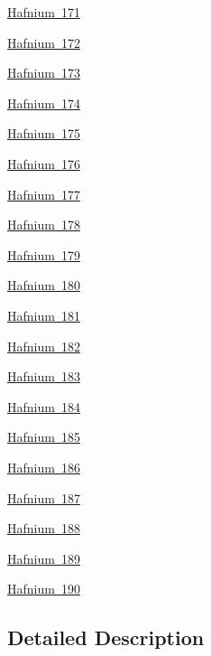 \begin{DoxyCompactItemize}
\item 
\mbox{\hyperlink{group___isotope_const-_hafnium-_hf171}{Hafnium 171}}
\item 
\mbox{\hyperlink{group___isotope_const-_hafnium-_hf172}{Hafnium 172}}
\item 
\mbox{\hyperlink{group___isotope_const-_hafnium-_hf173}{Hafnium 173}}
\item 
\mbox{\hyperlink{group___isotope_const-_hafnium-_hf174}{Hafnium 174}}
\item 
\mbox{\hyperlink{group___isotope_const-_hafnium-_hf175}{Hafnium 175}}
\item 
\mbox{\hyperlink{group___isotope_const-_hafnium-_hf176}{Hafnium 176}}
\item 
\mbox{\hyperlink{group___isotope_const-_hafnium-_hf177}{Hafnium 177}}
\item 
\mbox{\hyperlink{group___isotope_const-_hafnium-_hf178}{Hafnium 178}}
\item 
\mbox{\hyperlink{group___isotope_const-_hafnium-_hf179}{Hafnium 179}}
\item 
\mbox{\hyperlink{group___isotope_const-_hafnium-_hf180}{Hafnium 180}}
\item 
\mbox{\hyperlink{group___isotope_const-_hafnium-_hf181}{Hafnium 181}}
\item 
\mbox{\hyperlink{group___isotope_const-_hafnium-_hf182}{Hafnium 182}}
\item 
\mbox{\hyperlink{group___isotope_const-_hafnium-_hf183}{Hafnium 183}}
\item 
\mbox{\hyperlink{group___isotope_const-_hafnium-_hf184}{Hafnium 184}}
\item 
\mbox{\hyperlink{group___isotope_const-_hafnium-_hf185}{Hafnium 185}}
\item 
\mbox{\hyperlink{group___isotope_const-_hafnium-_hf186}{Hafnium 186}}
\item 
\mbox{\hyperlink{group___isotope_const-_hafnium-_hf187}{Hafnium 187}}
\item 
\mbox{\hyperlink{group___isotope_const-_hafnium-_hf188}{Hafnium 188}}
\item 
\mbox{\hyperlink{group___isotope_const-_hafnium-_hf189}{Hafnium 189}}
\item 
\mbox{\hyperlink{group___isotope_const-_hafnium-_hf190}{Hafnium 190}}
\end{DoxyCompactItemize}


\subsection{Detailed Description}
